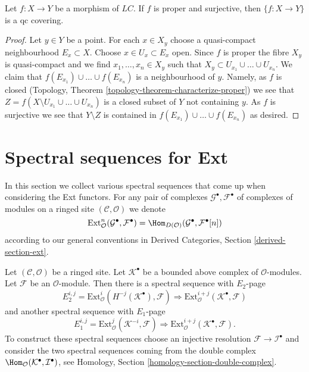 \begin{lemma}
\label{lemma-proper-surjective-is-qc-covering}
Let $f : X \to Y$ be a morphism of $\textit{LC}$.
If $f$ is proper and surjective, then $\{f : X \to Y\}$
is a qc covering.
\end{lemma}

\begin{proof}
Let $y \in Y$ be a point. For each $x \in X_y$ choose a quasi-compact
neighbourhood $E_x \subset X$. Choose $x \in U_x \subset E_x$ open.
Since $f$ is proper the fibre $X_y$ is quasi-compact and we find
$x_1, \ldots, x_n \in X_y$ such that
$X_y \subset U_{x_1} \cup \ldots \cup U_{x_n}$.
We claim that $f(E_{x_1}) \cup \ldots \cup f(E_{x_n})$ is a neighbourhood of
$y$. Namely, as $f$ is closed
(Topology, Theorem \ref{topology-theorem-characterize-proper})
we see that $Z = f(X \setminus U_{x_1} \cup \ldots \cup U_{x_n})$
is a closed subset of $Y$ not containing $y$. As $f$ is surjective
we see that $Y \setminus Z$ is contained in
$f(E_{x_1}) \cup \ldots \cup f(E_{x_n})$ as desired.
\end{proof}










\section{Spectral sequences for Ext}
\label{section-spectral-sequence-ext}

\noindent
In this section we collect various spectral sequences that come up
when considering the Ext functors. For any pair of complexes
$\mathcal{G}^\bullet, \mathcal{F}^\bullet$ of complexes of modules
on a ringed site $(\mathcal{C}, \mathcal{O})$ we denote
$$
\text{Ext}^n_\mathcal{O}(\mathcal{G}^\bullet, \mathcal{F}^\bullet)
=
\Hom_{D(\mathcal{O})}(\mathcal{G}^\bullet, \mathcal{F}^\bullet[n])
$$
according to our general conventions in
Derived Categories, Section \ref{derived-section-ext}.

\begin{example}
\label{example-hom-complex-into-sheaf}
Let $(\mathcal{C}, \mathcal{O})$ be a ringed site.
Let $\mathcal{K}^\bullet$ be a bounded above complex of $\mathcal{O}$-modules.
Let $\mathcal{F}$ be an $\mathcal{O}$-module. Then there is a
spectral sequence with $E_2$-page
$$
E_2^{i, j} =
\text{Ext}_\mathcal{O}^i(H^{-j}(\mathcal{K}^\bullet), \mathcal{F})
\Rightarrow
\text{Ext}_\mathcal{O}^{i + j}(\mathcal{K}^\bullet, \mathcal{F})
$$
and another spectral sequence with $E_1$-page
$$
E_1^{i, j} =
\text{Ext}_\mathcal{O}^j(\mathcal{K}^{-i}, \mathcal{F})
\Rightarrow
\text{Ext}_\mathcal{O}^{i + j}(\mathcal{K}^\bullet, \mathcal{F}).
$$
To construct these spectral sequences choose an injective resolution
$\mathcal{F} \to \mathcal{I}^\bullet$ and consider the two spectral
sequences coming from the double complex
$\Hom_\mathcal{O}(\mathcal{K}^\bullet, \mathcal{I}^\bullet)$, see
Homology, Section \ref{homology-section-double-complex}.
\end{example}







